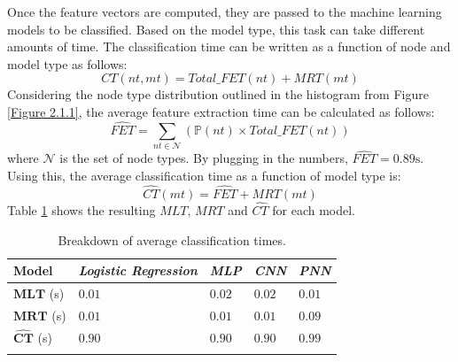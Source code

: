 			Once the feature vectors are computed, they are passed to the machine learning models to be classified. Based on the model type, this task can take different amounts of time. The classification time can be written as a function of node and model type as follows: 
			\begin{equation}
				CT(nt, mt) = Total\_FET(nt) + MRT(mt)
			\end{equation}
			Considering the node type distribution outlined in the histogram from Figure \ref{Figure 2.1.1}, the average feature extraction time can be calculated as follows:
			\begin{equation}
				\hat{FET} = \sum_{nt\in \mathbf{\mathcal{N}}} (\mathbb{P}(nt) \times Total\_FET(nt))
			\end{equation} 
			where $\mathcal{N}$ is the set of node types. By plugging in the numbers, $\hat{FET} = 0.89\text{s}$. Using this, the average classification time as a function of model type is: 
			\begin{equation}
				\hat{CT}(mt) =  \hat{FET} + MRT(mt) 
			\end{equation}  
			 Table \ref{Table: eval/service-time/classification/CT} shows the resulting $MLT$, $MRT$  and $\hat{CT}$ for each model.
			
			\begin{longtable}{|p{.15\textwidth}||p{}|p{}|p{}|p{}|}
				\textbf{Model} & \textit{Logistic Regression} & \textit{MLP} & \textit{CNN} & \textit{PNN} \\
				\hline
				$\mathbf{MLT}$ (s) & $0.01$ & $0.02$ & $0.02$ & $0.01$  \\
				\hline
				$\mathbf{MRT}$ (s) & $0.01$ &$0.01$ & $0.01$ & $0.09$ \\
				\hline\hline
				$\mathbf{\hat{CT}}$ (s) & $\mathbf{0.90}$ & $\mathbf{0.90}$ & $\mathbf{0.90}$ & $\mathbf{0.99}$ \\
				\hline
				\caption{Breakdown of average classification times.}
				\label{Table: eval/service-time/classification/CT}
			\end{longtable} 
			
